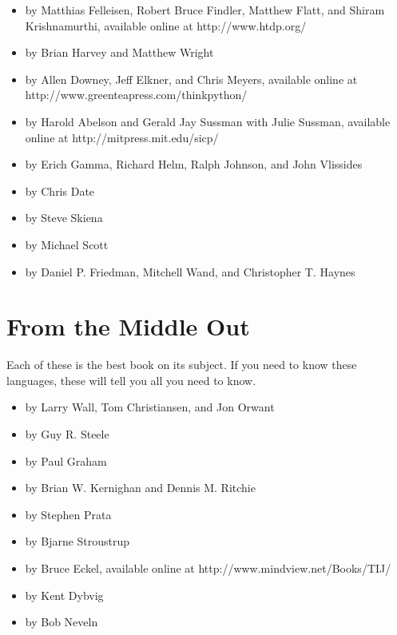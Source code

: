 \begin{itemize}\item {} by Matthias Felleisen, Robert Bruce Findler, Matthew Flatt, and Shiram Krishnamurthi, available online at http://www.htdp.org/ 
\item {} by Brian Harvey and Matthew Wright 
\item {} by Allen Downey, Jeff Elkner, and Chris Meyers, available online at http://www.greenteapress.com/thinkpython/ 
\item {} by Harold Abelson and Gerald Jay Sussman with Julie Sussman, available online at http://mitpress.mit.edu/sicp/ 
\item {} by Erich Gamma, Richard Helm, Ralph Johnson, and John Vlissides 
\item {} by Chris Date 
\item {} by Steve Skiena 
\item {} by Michael Scott 
\item {} by Daniel P. Friedman, Mitchell Wand, and Christopher T. Haynes 
\end{itemize}

\section{From the Middle Out}

Each of these is the best book on its subject.  If you need to know these
languages, these will tell you all you need to know.

\begin{itemize}\item {} by Larry Wall, Tom Christiansen, and Jon Orwant 
\item {} by Guy R. Steele 
\item {} by Paul Graham 
\item {} by Brian W. Kernighan and Dennis M. Ritchie 
\item {} by Stephen Prata 
\item {} by Bjarne Stroustrup 
\item {} by Bruce Eckel, available online at http://www.mindview.net/Books/TIJ/ 
\item {} by Kent Dybvig 
\item {} by Bob Neveln 
\end{itemize}

